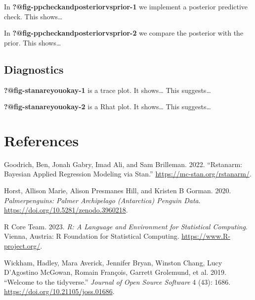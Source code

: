 \documentclass[
  letterpaper,
  DIV=11,
  numbers=noendperiod]{scrartcl}
\newlength{\cslhangindent}
\newenvironment{CSLReferences}[2] %
 {\begin{list}{}{%
  \setlength{\itemindent}{0pt}
  \setlength{\leftmargin}{0pt}
  \setlength{\parsep}{0pt}
  \ifodd #1
   \setlength{\leftmargin}{\cslhangindent}
   \setlength{\itemindent}{-1\cslhangindent}
  \fi
  \setlength{\itemsep}{#2\baselineskip}}}
 {\end{list}}
\begin{document}
In \textbf{?@fig-ppcheckandposteriorvsprior-1} we implement a posterior
predictive check. This shows\ldots{}

In \textbf{?@fig-ppcheckandposteriorvsprior-2} we compare the posterior
with the prior. This shows\ldots{}

\subsection{Diagnostics}\label{diagnostics}

\textbf{?@fig-stanareyouokay-1} is a trace plot. It shows\ldots{} This
suggests\ldots{}

\textbf{?@fig-stanareyouokay-2} is a Rhat plot. It shows\ldots{} This
suggests\ldots{}

\newpage

\section*{References}\label{references}

\label{refs}
\begin{CSLReferences}{1}{0}
Goodrich, Ben, Jonah Gabry, Imad Ali, and Sam Brilleman. 2022.
{``Rstanarm: {Bayesian} Applied Regression Modeling via {Stan}.''}
\url{https://mc-stan.org/rstanarm/}.

Horst, Allison Marie, Alison Presmanes Hill, and Kristen B Gorman. 2020.
\emph{Palmerpenguins: Palmer Archipelago (Antarctica) Penguin Data}.
\url{https://doi.org/10.5281/zenodo.3960218}.

R Core Team. 2023. \emph{R: A Language and Environment for Statistical
Computing}. Vienna, Austria: R Foundation for Statistical Computing.
\url{https://www.R-project.org/}.

Wickham, Hadley, Mara Averick, Jennifer Bryan, Winston Chang, Lucy
D'Agostino McGowan, Romain François, Garrett Grolemund, et al. 2019.
{``Welcome to the {tidyverse}.''} \emph{Journal of Open Source Software}
4 (43): 1686. \url{https://doi.org/10.21105/joss.01686}.

\end{CSLReferences}
\end{document}
